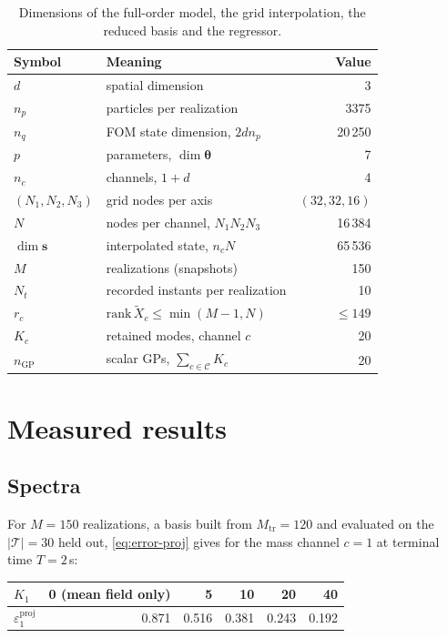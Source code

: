 \documentclass[11pt]{article}
\newcommand{\bs}[1]{\boldsymbol{#1}}
\begin{document}
\begin{table}[t]
\centering
\begin{tabular}{llr}
\toprule
Symbol & Meaning & Value \\
\midrule
$d$ & spatial dimension & 3 \\
$n_p$ & particles per realization & 3375 \\
$n_q$ & FOM state dimension, $2 d n_p$ & 20\,250 \\
$p$ & parameters, $\dim \bs{\theta}$ & 7 \\
$n_c$ & channels, $1 + d$ & 4 \\
$(N_1,N_2,N_3)$ & grid nodes per axis & $(32,32,16)$ \\
$N$ & nodes per channel, $N_1 N_2 N_3$ & 16\,384 \\
$\dim \bs{s}$ & interpolated state, $n_c N$ & 65\,536 \\
$M$ & realizations (snapshots) & 150 \\
$N_t$ & recorded instants per realization & 10 \\
$r_c$ & $\mathrm{rank}\,\tilde{X}_c \leq \min(M-1,N)$ & $\leq 149$ \\
$K_c$ & retained modes, channel $c$ & 20 \\
$n_{\mathrm{GP}}$ & scalar GPs, $\sum_{c \in \mathcal{C}} K_c$ & 20 \\
\bottomrule
\end{tabular}
\caption{Dimensions of the full-order model, the grid interpolation, the reduced basis and
the regressor.}
\label{tab:dims}
\end{table}

\section{Measured results}
\label{sec:measured}

\subsection{Spectra}

For $M = 150$ realizations, a basis built from $M_{\mathrm{tr}} = 120$ and evaluated on the
$|\mathcal{T}| = 30$ held out, \eqref{eq:error-proj} gives for the mass channel $c=1$ at
terminal time $T = 2$\,s:

\begin{center}
\begin{tabular}{lrrrrr}
\toprule
$K_1$ & 0 (mean field only) & 5 & 10 & 20 & 40 \\
\midrule
$\varepsilon^{\text{proj}}_1$ & 0.871 & 0.516 & 0.381 & 0.243 & 0.192 \\
\bottomrule
\end{tabular}
\end{center}
\end{document}
